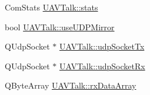 \begin{DoxyCompactItemize}
\item 
Com\-Stats \hyperlink{group___u_a_v_talk_plugin_ga35edebb70765f832afb1174152d4e20c}{U\-A\-V\-Talk\-::stats}
\item 
bool \hyperlink{group___u_a_v_talk_plugin_ga5198259bc34e6f215c111d731b822e3f}{U\-A\-V\-Talk\-::use\-U\-D\-P\-Mirror}
\item 
Q\-Udp\-Socket $\ast$ \hyperlink{group___u_a_v_talk_plugin_ga02f40e7ac97a6778928a5e9869ea5bc8}{U\-A\-V\-Talk\-::udp\-Socket\-Tx}
\item 
Q\-Udp\-Socket $\ast$ \hyperlink{group___u_a_v_talk_plugin_ga3fe3d99135440f58cb74fb73a4055ef4}{U\-A\-V\-Talk\-::udp\-Socket\-Rx}
\item 
Q\-Byte\-Array \hyperlink{group___u_a_v_talk_plugin_ga053813b68171430545f1bc1d69d450a0}{U\-A\-V\-Talk\-::rx\-Data\-Array}
\end{DoxyCompactItemize}
